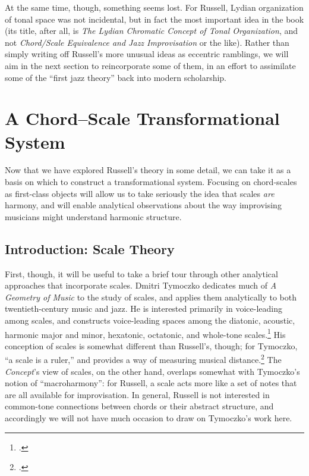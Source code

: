 At the same time, though, something seems lost. For Russell, Lydian
organization of tonal space was not incidental, but in fact the most important
idea in the book (its title, after all, is \emph{The Lydian Chromatic Concept
  of Tonal Organization}, and not \emph{Chord/Scale Equivalence and Jazz
  Improvisation} or the like). Rather than simply writing off Russell's more
unusual ideas as eccentric ramblings, we will aim in the next section to
reincorporate some of them, in an effort to assimilate some of the ``first
jazz theory'' back into modern scholarship.

\section{A Chord--Scale Transformational System}
\label{sec:cst}

Now that we have explored Russell's theory in some detail, we can take it as a
basis on which to construct a transformational system. Focusing on
chord-scales as first-class objects will allow us to take seriously the idea
that scales \emph{are} harmony, and will enable analytical observations about
the way improvising musicians might understand harmonic structure.

\subsection{Introduction: Scale Theory}
\label{subsec:scale-theory}

First, though, it will be useful to take a brief tour through other analytical
approaches that incorporate scales. Dmitri Tymoczko dedicates much of \emph{A
Geometry of Music} to the study of scales, and applies them analytically to
both twentieth-century music and jazz. He is interested primarily in
voice-leading among scales, and constructs voice-leading spaces among the
diatonic, acoustic, harmonic major and minor, hexatonic, octatonic, and
whole-tone scales.\footcite[135]{tymoczko:2011} His conception of scales
is somewhat different than Russell's, though; for Tymoczko, ``a scale is a
ruler,'' and provides a way of measuring musical
distance.\footcite[116]{tymoczko:2011} The \emph{Concept}'s view of scales, on
the other hand, overlaps somewhat with
Tymoczko's notion of ``macroharmony'': for Russell, a scale acts more like a
set of notes that are all available for improvisation. In general, Russell is
not interested in common-tone connections between chords or their abstract
structure, and accordingly we will not have much occasion to draw on
Tymoczko's work here.

